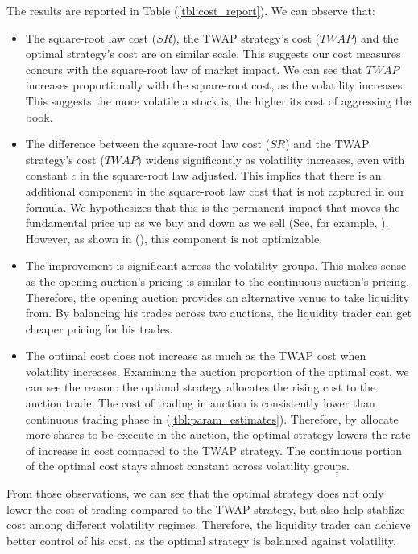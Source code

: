 The results are reported in Table (\ref{tbl:cost_report}). We can observe that:
\begin{itemize}
  \item The square-root law cost ($SR$), the TWAP strategy's cost ($TWAP$) and the optimal strategy's cost are on similar scale. This suggests our cost measures concurs with the square-root law of market impact. We can see that $TWAP$ increases proportionally with the square-root cost, as the volatility increases. This suggests the more volatile a stock is, the higher its cost of aggressing the book.
  \item The difference between the square-root law cost ($SR$) and the TWAP strategy's cost ($TWAP$) widens significantly as volatility increases, even with constant $c$ in the square-root law adjusted. This implies that there is an additional component in the square-root law cost that is not captured in our formula. We hypothesizes that this is the permanent impact that moves the fundamental price up as we buy and down as we sell (See, for example, \cite{Kyle1985}). However, as shown in (\cite{Almgren2000}), this component is not optimizable.
  \item The improvement is significant across the volatility groups. This makes sense as the opening auction's pricing is similar to the continuous auction's pricing. Therefore, the opening auction provides an alternative venue to take liquidity from. By balancing his trades across two auctions, the liquidity trader can get cheaper pricing for his trades.
  \item The optimal cost does not increase as much as the TWAP cost when volatility increases. Examining the auction proportion of the optimal cost, we can see the reason: the optimal strategy allocates the rising cost to the auction trade. The cost of trading in auction is consistently lower than continuous trading phase in (\ref{tbl:param_estimates}). Therefore, by allocate more shares to be execute in the auction, the optimal strategy lowers the rate of increase in cost compared to the TWAP strategy. The continuous portion of the optimal cost stays almost constant across volatility groups.
\end{itemize}

From those observations, we can see that the optimal strategy does not only lower the cost of trading compared to the TWAP strategy, but also help stablize cost among different volatility regimes. Therefore, the liquidity trader can achieve better control of his cost, as the optimal strategy is balanced against volatility.

